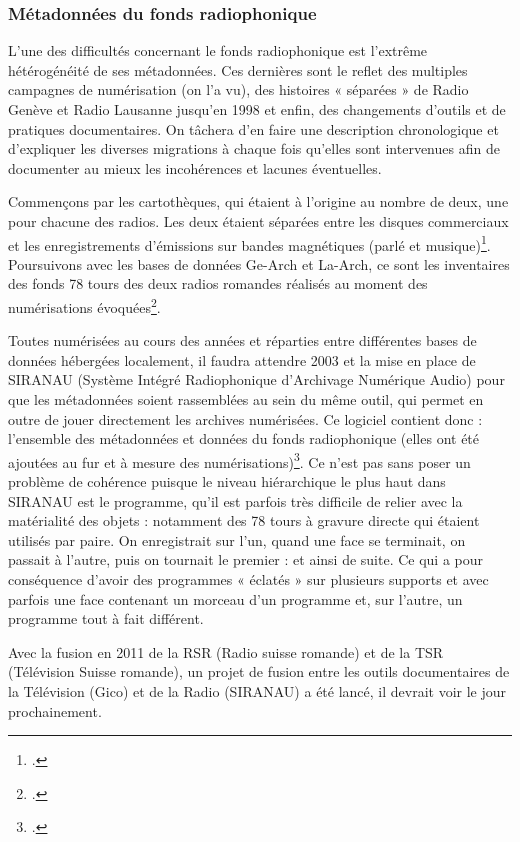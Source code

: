 \subsubsection{Métadonnées du fonds radiophonique}

L’une des difficultés concernant le fonds radiophonique est l’extrême hétérogénéité de ses métadonnées. Ces dernières sont le reflet des multiples campagnes de numérisation (on l’a vu), des histoires « séparées » de Radio Genève et Radio Lausanne jusqu’en 1998 et enfin, des changements d’outils et de pratiques documentaires. On tâchera d’en faire une description chronologique et d’expliquer les diverses migrations à chaque fois qu’elles sont intervenues afin de documenter au mieux les incohérences et lacunes éventuelles.

Commençons par les cartothèques, qui étaient à l’origine au nombre de deux, une pour chacune des radios. Les deux étaient séparées entre les disques commerciaux et les enregistrements d’émissions sur bandes magnétiques (parlé et musique)\footcite[pp. 34-37]{prongue2009}. Poursuivons avec les bases de données Ge-Arch et La-Arch, ce sont les inventaires des fonds 78 tours des deux radios romandes réalisés au moment des numérisations évoquées\footcite[p. 33]{prongue2009}.

Toutes numérisées au cours des années et réparties entre différentes bases de données hébergées localement, il faudra attendre 2003 et la mise en place de SIRANAU (Système Intégré Radiophonique d’Archivage Numérique Audio) pour que les métadonnées soient rassemblées au sein du même outil, qui permet en outre de jouer directement les archives numérisées. Ce logiciel contient donc : l’ensemble des métadonnées et données du fonds radiophonique (elles ont été ajoutées au fur et à mesure des numérisations)\footcite[p. 37]{prongue2009}. Ce n’est pas sans poser un problème de cohérence puisque le niveau hiérarchique le plus haut dans SIRANAU est le programme, qu’il est parfois très difficile de relier avec la matérialité des objets : notamment des 78 tours à gravure directe qui étaient utilisés par paire. On enregistrait sur l’un, quand une face se terminait, on passait à l’autre, puis on tournait le premier : et ainsi de suite. Ce qui a pour conséquence d’avoir des programmes « éclatés » sur plusieurs supports et avec parfois une face contenant un morceau d’un programme et, sur l’autre, un programme tout à fait différent.

Avec la fusion en 2011 de la RSR (Radio suisse romande) et de la TSR (Télévision Suisse romande), un projet de fusion entre les outils documentaires de la Télévision (Gico) et de la Radio (SIRANAU) a été lancé, il devrait voir le jour prochainement.

